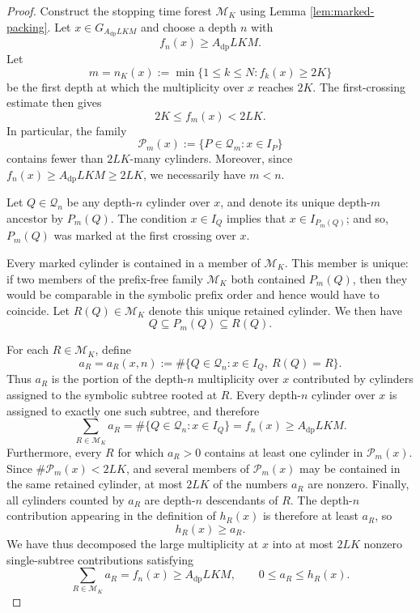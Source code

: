 \documentclass[12pt]{amsart}
\numberwithin{equation}{section}
\begin{document}
\begin{proof}
Construct the stopping time forest $\mathscr M_K$ using Lemma \ref{lem:marked-packing}.  Let $x\in G_{A_{\mathrm{dp}}LKM}$ and choose a depth $n$ with
\[
 f_n(x)\geq A_{\mathrm{dp}}LKM.
\]
Let
\[
 m = n_K (x) := \min \big\{1 \leq k \leq N : f_{k} (x) \geq 2 K \big\}
\]
be the first depth at which the multiplicity over $x$ reaches $2K$.  The first-crossing estimate then gives
$$
 2K\leq f_m(x)<2LK.
$$
In particular, the family
$$
 \mathscr P_m(x):=\{P\in\mathscr Q_m:x\in I_P\}
$$
contains fewer than $2LK$-many cylinders.  Moreover, since
$f_n(x)\geq A_{\mathrm{dp}}LKM\geq2LK$, we necessarily have $m<n$.

Let $Q\in\mathscr Q_n$ be any depth-$n$ cylinder over $x$, and denote its unique depth-$m$ ancestor by $P_m(Q)$.  The condition $x\in I_Q$ implies that $x\in I_{P_m(Q)}$; and so,
$P_m(Q)$ was marked at the first crossing over $x$.

Every marked cylinder is contained in a member of $\mathscr M_K$.  This member is unique: if two members of the prefix-free family $\mathscr M_K$ both contained $P_m(Q)$, then they would be comparable in the symbolic prefix order and hence would have to coincide.  Let $R(Q)\in\mathscr M_K$
denote this unique retained cylinder.  We then have
\[
 Q\subseteq P_m(Q)\subseteq R(Q).
\]

For each $R\in\mathscr M_K$, define
\[
 a_R=a_R(x,n)
 :=
 \#\bigl\{
 Q\in\mathscr Q_n:
 x\in I_Q,\ R(Q)=R
 \bigr\}.
\]
Thus $a_R$ is the portion of the depth-$n$ multiplicity over $x$ contributed
by cylinders assigned to the symbolic subtree rooted at $R$.  Every depth-$n$ cylinder over $x$ is assigned to exactly one such subtree, and therefore
\[
 \sum_{R\in\mathscr M_K}a_R
 =
 \#\{Q\in\mathscr Q_n:x\in I_Q\}
 =
 f_n(x)
 \geq A_{\mathrm{dp}}LKM.
\]
Furthermore, every $R$ for which $a_R>0$ contains at least one cylinder in
$\mathscr P_m(x)$.  Since $\#\mathscr P_m(x)<2LK$, and several members of $\mathscr P_m(x)$ may be contained in the same retained cylinder, at most $2LK$ of the numbers $a_R$ are nonzero. Finally, all cylinders counted by $a_R$ are depth-$n$ descendants of $R$. The depth-$n$ contribution appearing in the definition of $h_R(x)$ is therefore at least $a_R$, so
\[
 h_R(x)\geq a_R.
\]
We have thus decomposed the large multiplicity at $x$ into at most $2LK$ nonzero single-subtree contributions satisfying
\[
 \sum_{R\in\mathscr M_K}a_R=f_n(x)
 \geq A_{\mathrm{dp}}LKM,
 \qquad
 0\leq a_R\leq h_R(x).
\]


\end{proof}
\end{document}
